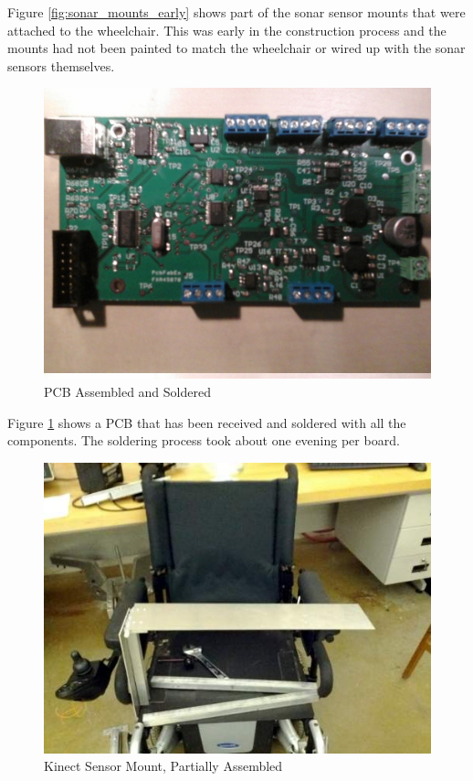\documentclass[oneside,final,a4paper]{report}
\begin{document}
Figure \ref{fig:sonar_mounts_early} shows part of the sonar sensor mounts that were attached to the wheelchair. This was early in the construction process and the mounts had not been painted to match the wheelchair or wired up with the sonar sensors themselves.

\begin{figure}[hbt]
 \centering
 \includegraphics[scale=0.35]{solder_complete}
 \caption{PCB Assembled and Soldered}
 \label{fig:PCB_assem}
\end{figure}

Figure \ref{fig:PCB_assem} shows a PCB that has been received and soldered with all the components. The soldering process took about one evening per board.

\begin{figure}[hbt]
 \centering
 \includegraphics[scale=0.35]{Kinect_Shelf}
 \caption{Kinect Sensor Mount, Partially Assembled}
 \label{fig:kinect_partial}
\end{figure}
\end{document}
